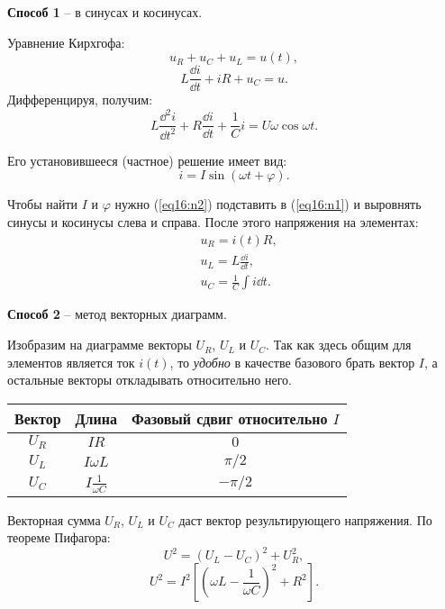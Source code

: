 	\begin{solution}
        
        \textbf{Способ 1} -- в синусах и косинусах.
        
        Уравнение Кирхгофа:
        \[
            u_R + u_C + u_L = u(t),
        \]
        \[
            L\frac{\dd i}{\dd t} + iR + u_C = u.
        \]
        Дифференцируя, получим:
        \begin{equation}
            L\frac{\dd^2 i}{\dd t^2} + R\frac{\dd i}{\dd t} + \frac{1}{C}i =
            U\omega\cos\omega t.
            \label{eq16:n1}
        \end{equation}
        
        Его установившееся (частное) решение имеет вид:
        \begin{equation}
            i = I\sin(\omega t + \varphi).
            \label{eq16:n2}
        \end{equation}
        
        Чтобы найти \( I \) и \( \varphi \) нужно (\ref{eq16:n2}) подставить в
        (\ref{eq16:n1}) и выровнять синусы и косинусы слева и справа. После
        этого напряжения на элементах:
        \begin{align*}
            & u_R = i(t)R, \\
            & u_L = L\frac{\dd i}{\dd t}, \\
            & u_C = \frac{1}{C}\int i\dd t.
        \end{align*}
        
        \textbf{Способ 2} -- метод векторных диаграмм.
        
        Изобразим на диаграмме векторы \( U_R \), \( U_L \) и \( U_C \). Так
        как здесь общим для элементов является ток \( i(t) \), то
        \textit{удобно} в качестве базового брать вектор \( I \), а остальные
        векторы откладывать относительно него.
        
        \begin{table}
            \center
            \begin{tabular}[c]{|c|c|c|}\hline
                Вектор & Длина & Фазовый сдвиг относительно \( I \) \\ \hline
                \( U_R \) & \( IR \) & \( 0 \) \\
                \( U_L \) & \( I\omega L \) & \( \pi/2 \) \\
                \( U_C \) & \( I\frac{1}{\omega C} \) & \( -\pi/2 \) \\ \hline
            \end{tabular}
        \end{table}
        Векторная сумма \( U_R \), \( U_L \) и \( U_C \) даст вектор
        результирующего напряжения. По теореме Пифагора:
        \[
            U^2 = (U_L - U_C)^2 + U_R^2,
        \]
        \[
            U^2 = I^2\left[\left(\omega L - \frac{1}{\omega C}\right)^2 +
            R^2\right].
        \]
        

\end{solution}
